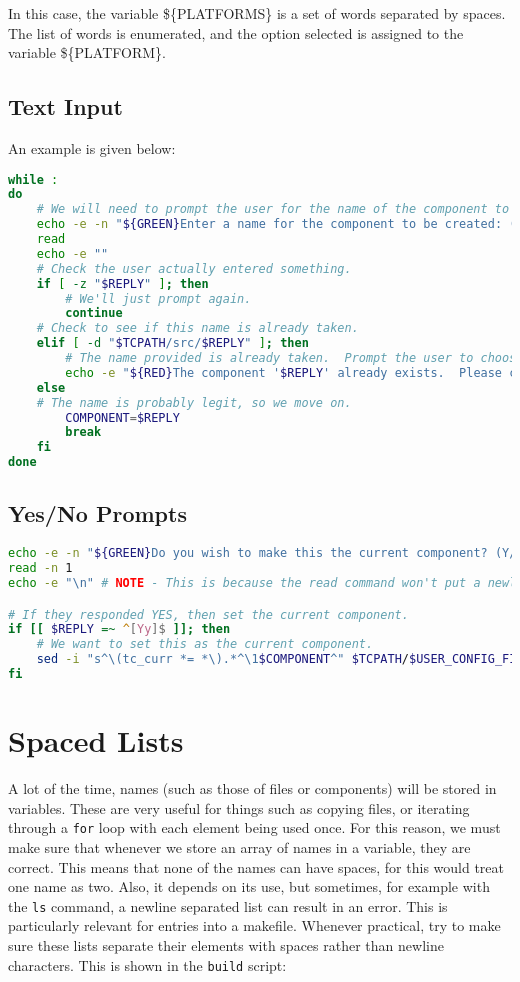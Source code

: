 \documentclass[a4paper, oneside, 11pt, titlepage, onecolumn, openright]{report}
\begin{document}
In this case, the variable \$\{PLATFORMS\} is a set of words separated by spaces. The list of words is enumerated, and the option selected is assigned to the variable \$\{PLATFORM\}. 

\subsection{Text Input}
			\label{ss:TextInput}
			An example is given below:

\begin{lstlisting}[frame=trBL, breaklines=true, language = bash]		
while :
do
	# We will need to prompt the user for the name of the component to create.
	echo -e -n "${GREEN}Enter a name for the component to be created: (No spaces) ${NO_COLOUR}"
	read
	echo -e "" 
	# Check the user actually entered something.
	if [ -z "$REPLY" ]; then
		# We'll just prompt again.
		continue
	# Check to see if this name is already taken.
	elif [ -d "$TCPATH/src/$REPLY" ]; then
		# The name provided is already taken.  Prompt the user to choose an available name.
		echo -e "${RED}The component '$REPLY' already exists.  Please choose another name.\n${NO_COLOUR}"
	else
	# The name is probably legit, so we move on.
		COMPONENT=$REPLY
		break
	fi
done
\end{lstlisting}

\subsection{Yes/No Prompts}
			\label{ss:YNPrompts}
			
\begin{lstlisting}[frame=trBL, breaklines=true, language = bash]
echo -e -n "${GREEN}Do you wish to make this the current component? (Y/N)${NO_COLOUR}"
read -n 1
echo -e "\n" # NOTE - This is because the read command won't put a newline after it reads a character.	

# If they responded YES, then set the current component.	
if [[ $REPLY =~ ^[Yy]$ ]]; then
	# We want to set this as the current component.
	sed -i "s^\(tc_curr *= *\).*^\1$COMPONENT^" $TCPATH/$USER_CONFIG_FILE
fi			
\end{lstlisting}

\section{Spaced Lists}
			\label{s:SpacedLists}
			A lot of the time, names (such as those of files or components) will be stored in variables. These are very useful for things such as copying files, or iterating through a \texttt{for} loop with each element being used once. 
			For this reason, we must make sure that whenever we store an array of names in a variable, they are correct. This means that none of the names can have spaces, for this would treat one name as two. 
			Also, it depends on its use, but sometimes, for example with the \texttt{ls} command, a newline separated list can result in an error. This is particularly relevant for entries into a makefile. Whenever practical, try to make sure these lists separate their elements with spaces rather than newline characters. 
			This is shown in the \texttt{build} script:
			
\end{document}
